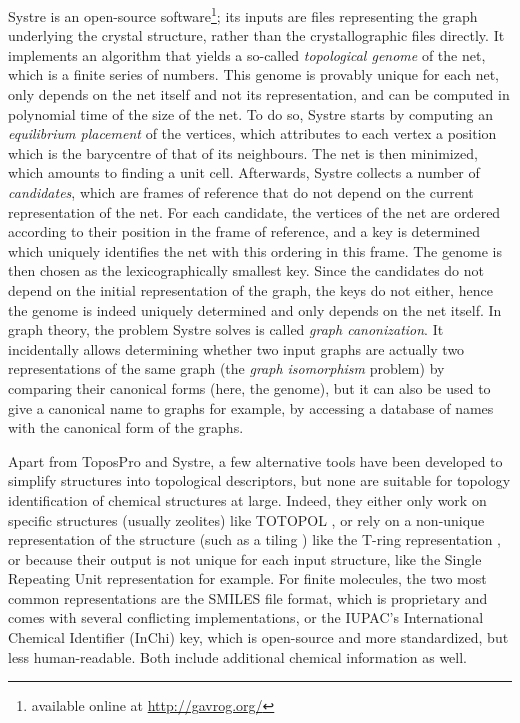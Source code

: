 \documentclass[main.tex]{subfiles}
\begin{document}
Systre is an open-source software\footnote{available online at \url{http://gavrog.org/}}; its inputs are files representing the graph underlying the crystal structure, rather than the crystallographic files directly. It implements an algorithm that yields a so-called \emph{topological genome} \autocite{genome} of the net, which is a finite series of numbers. This genome is provably unique for each net, only depends on the net itself and not its representation, and can be computed in polynomial time of the size of the net. To do so, Systre starts by computing an \emph{equilibrium placement} \autocite{barycentric} of the vertices, which attributes to each vertex a position which is the barycentre of that of its neighbours. The net is then minimized, which amounts to finding a unit cell. Afterwards, Systre collects a number of \emph{candidates}, which are frames of reference that do not depend on the current representation of the net. For each candidate, the vertices of the net are ordered according to their position in the frame of reference, and a key is determined which uniquely identifies the net with this ordering in this frame. The genome is then chosen as the lexicographically smallest key. Since the candidates do not depend on the initial representation of the graph, the keys do not either, hence the genome is indeed uniquely determined and only depends on the net itself. In graph theory, the problem Systre solves is called \textit{graph canonization}. It incidentally allows determining whether two input graphs are actually two representations of the same graph (the \textit{graph isomorphism} problem) by comparing their canonical forms (here, the genome), but it can also be used to give a canonical name to graphs for example, by accessing a database of names with the canonical form of the graphs.

Apart from ToposPro and Systre, a few alternative tools have been developed to simplify structures into topological descriptors, but none are suitable for topology identification of chemical structures at large. Indeed, they either only work on specific structures (usually zeolites) like TOTOPOL \autocite{Totopol}, or rely on a non-unique representation of the structure (such as a tiling \autocite{Tiling}) like the T-ring representation \autocite{ChemicalHieroglyphs}, or because their output is not unique for each input structure, like the Single Repeating Unit representation \autocite{GandhiGraphTheoreticRepresentation} for example. For finite molecules, the two most common representations are the SMILES \autocite{SMILES} file format, which is proprietary and comes with several conflicting implementations, or the IUPAC's International Chemical Identifier (InChi) \autocite{InChi} key, which is open-source and more standardized, but less human-readable. Both include additional chemical information as well.
\end{document}
